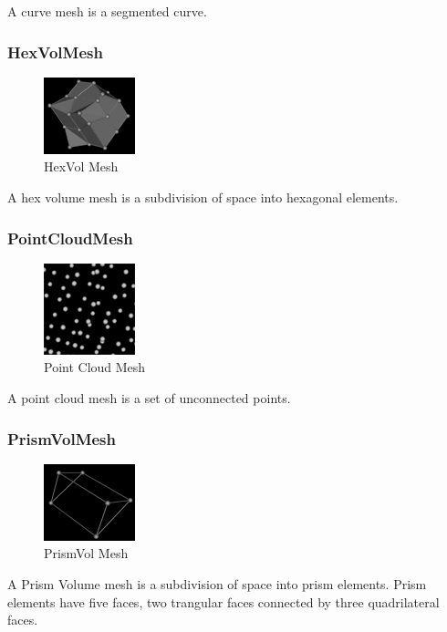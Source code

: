 \documentclass[fleqn,12pt,openany]{book}
\begin{document}
A curve mesh is a segmented curve.

\subsubsection{HexVolMesh}
\begin{figure}[H]\label{hexvolmesh}
\includegraphics{UserGuide_figures/HexVol.png}
\caption{HexVol Mesh}
\end{figure}

A hex volume mesh is a subdivision of space into hexagonal elements.

\subsubsection{PointCloudMesh}
\begin{figure}[H]\label{pointcloudmesh}
\includegraphics{UserGuide_figures/PointCloud.png}
\caption{Point Cloud Mesh}
\end{figure}

A point cloud  mesh is a set of unconnected points.

\subsubsection{PrismVolMesh}
\begin{figure}[H]\label{prismvolmesh}
\includegraphics{UserGuide_figures/PrismVol.png}
\caption{PrismVol Mesh}
\end{figure}

A Prism Volume mesh  is a subdivision of space into prism elements.
Prism elements have five faces, two trangular faces connected by three quadrilateral faces. 
\end{document}
